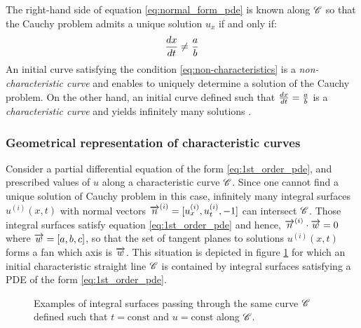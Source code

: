 The right-hand side of equation \eqref{eq:normal_form_pde} is known along $\mathscr{C}$ so that the Cauchy problem admits a unique solution $u_x$ if and only if:
\begin{equation}
  \label{eq:non-characteristics}
  \frac{d x}{d t}\neq \frac{a}{b}
\end{equation}
An initial curve satisfying the condition \eqref{eq:non-characteristics} is a \textit{non-characteristic curve} and enables to uniquely determine a solution of the Cauchy problem. On the other hand, an initial curve defined such that $\frac{d x}{d t} = \frac{a}{b}$ is a \textit{characteristic curve} and yields infinitely many solutions \cite[p.65]{Courant}. 



\subsubsection*{Geometrical representation of characteristic curves}
Consider a partial differential equation of the form \eqref{eq:1st_order_pde}, and prescribed values of $u$ along a characteristic curve $\mathscr{C}$. Since one cannot find a unique solution of Cauchy problem in this case, infinitely many integral surfaces $u^{(i)}(x,t)$ with normal vectors ${\overrightarrow{n}}^{(i)}=[u^{(i)}_x,u^{(i)}_t,-1]$ can intersect $\mathscr{C}$. Those integral surfaces satisfy equation \eqref{eq:1st_order_pde} and hence, ${\overrightarrow{n}}^{(i)}\cdot {\overrightarrow{w}}=0$ where ${\overrightarrow{w}}=[a,b,c]$, so that the set of tangent planes to solutions $u^{(i)}(x,t)$ forms a fan which axis is ${\overrightarrow{w}}$.
This situation is depicted in figure \ref{fig:plan_fan} for which an initial characteristic straight line $\mathscr{C}$ is contained by integral surfaces satisfying a PDE of the form \eqref{eq:1st_order_pde}.
\begin{figure}[h!]
  \centering
  
  \caption{Examples of integral surfaces passing through the same curve $\mathscr{C}$ defined such that $t=\mathrm{const}$ and $u=\mathrm{const}$ along $\mathscr{C}$.}
  \label{fig:plan_fan}
\end{figure}

